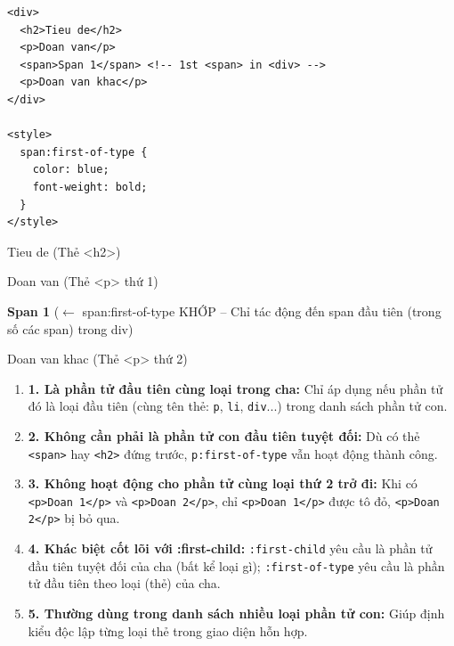 \documentclass[11pt,oneside]{book}
\newcommand{\codeinline}[1]{\textcolor{accentOrange}{\texttt{#1}}}
\begin{document}
\begin{codeWindow}
\begin{lstlisting}[language=HTML5]
<div>
  <h2>Tieu de</h2>
  <p>Doan van</p>
  <span>Span 1</span> <!-- 1st <span> in <div> -->
  <p>Doan van khac</p>
</div>

<style>
  span:first-of-type {
    color: blue;
    font-weight: bold;
  }
</style>
\end{lstlisting}
\end{codeWindow}

\begin{browserWindow}
\sffamily\small
Tieu de {\scriptsize\textcolor{gray!60}{(Thẻ <h2>)}} \par\vspace{2pt}
Doan van {\scriptsize\textcolor{gray!60}{(Thẻ <p> thứ 1)}} \par\vspace{2pt}
\textcolor{primaryBlue}{\textbf{Span 1}} {\scriptsize\textcolor{gray!60}{($\leftarrow$ span:first-of-type KHỚP -- Chỉ tác động đến span đầu tiên (trong số các span) trong div)}} \par\vspace{2pt}
Doan van khac {\scriptsize\textcolor{gray!60}{(Thẻ <p> thứ 2)}}
\end{browserWindow}

\begin{warnBox}
\begin{enumerate}[leftmargin=1.5em, itemsep=3pt, parsep=0pt]
    \item \textbf{1. Là phần tử đầu tiên cùng loại trong cha:} Chỉ áp dụng nếu phần tử đó là loại đầu tiên (cùng tên thẻ: \codeinline{p}, \codeinline{li}, \codeinline{div}...) trong danh sách phần tử con.
    \item \textbf{2. Không cần phải là phần tử con đầu tiên tuyệt đối:} Dù có thẻ \codeinline{<span>} hay \codeinline{<h2>} đứng trước, \codeinline{p:first-of-type} vẫn hoạt động thành công.
    \item \textbf{3. Không hoạt động cho phần tử cùng loại thứ 2 trở đi:} Khi có \codeinline{<p>Doan 1</p>} và \codeinline{<p>Doan 2</p>}, chỉ \codeinline{<p>Doan 1</p>} được tô đỏ, \codeinline{<p>Doan 2</p>} bị bỏ qua.
    \item \textbf{4. Khác biệt cốt lõi với :first-child:} \codeinline{:first-child} yêu cầu là phần tử đầu tiên tuyệt đối của cha (bất kể loại gì); \codeinline{:first-of-type} yêu cầu là phần tử đầu tiên theo loại (thẻ) của cha.
    \item \textbf{5. Thường dùng trong danh sách nhiều loại phần tử con:} Giúp định kiểu độc lập từng loại thẻ trong giao diện hỗn hợp.
\end{enumerate}
\end{warnBox}
\end{document}
